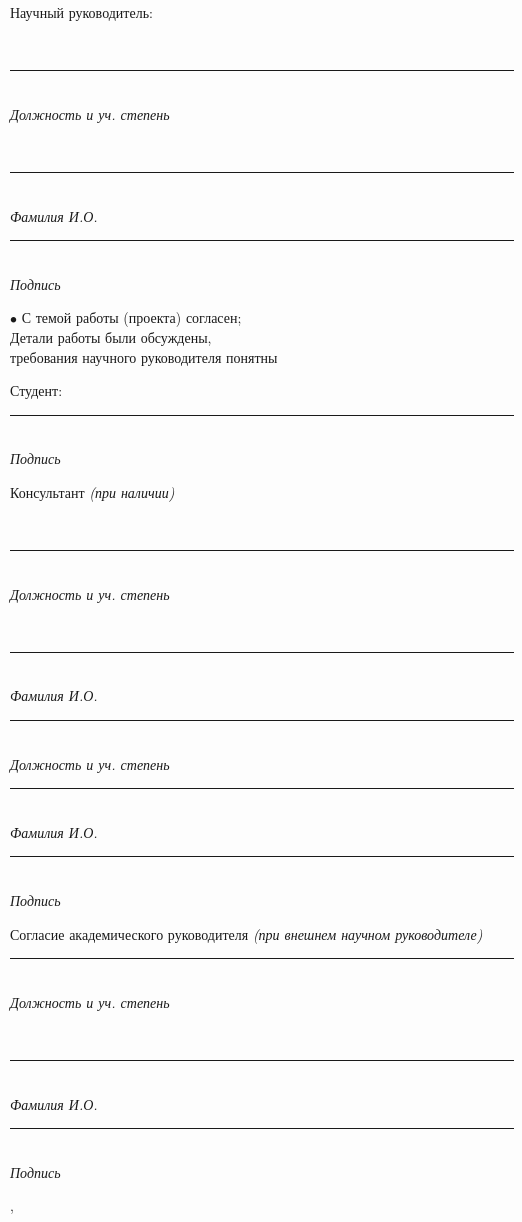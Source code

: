 \documentclass[12pt,a4paper]{article}
\newcommand{\hseSignField}[2]{%
  \begin{minipage}[t]{#1}\centering
    \rule{\linewidth}{0.4pt}\\[-2pt]{\footnotesize\itshape #2}
  \end{minipage}}
\newcommand{\hseFilledField}[3]{%
  \begin{minipage}[t]{#1}\centering
    {\small\strut #2}\\[-4pt]\rule{\linewidth}{0.4pt}\\[-2pt]{\footnotesize\itshape #3}
  \end{minipage}}
\begin{document}
\vspace{0.3cm}
\begin{minipage}[t]{0.27\textwidth}\raggedright Научный руководитель:\end{minipage}%
\hseFilledField{0.3\textwidth}{\hseSupervisorTitle\ifdefempty{\hseSupervisorDegree}{}{, \hseSupervisorDegree}}{Должность и уч. степень}\hfill
\hseFilledField{0.22\textwidth}{\hseSupervisorShortName}{Фамилия И.О.}\hfill
\hseSignField{0.15\textwidth}{Подпись}

\vspace{0.5cm}
\begin{minipage}[t]{0.55\textwidth}
$\bullet$ С темой работы (проекта) согласен;\\
Детали работы были обсуждены,\\
требования научного руководителя понятны
\end{minipage}\hfill
\begin{minipage}[t]{0.4\textwidth}
\vspace{0.5cm}
Студент: \hfill \hseSignField{0.5\textwidth}{Подпись}
\end{minipage}

\vspace{0.5cm}
\begin{minipage}[t]{0.27\textwidth}\raggedright Консультант {\itshape(при наличии)}\end{minipage}%
\ifhseHasCoSupervisor
\hseFilledField{0.3\textwidth}{\hseCoSupervisorTitle\ifdefempty{\hseCoSupervisorDegree}{}{, \hseCoSupervisorDegree}}{Должность и уч. степень}\hfill
\hseFilledField{0.22\textwidth}{\hseCoSupervisorShortName}{Фамилия И.О.}\hfill
\else
\hseSignField{0.3\textwidth}{Должность и уч. степень}\hfill
\hseSignField{0.22\textwidth}{Фамилия И.О.}\hfill
\fi
\hseSignField{0.15\textwidth}{Подпись}

\vspace{0.5cm}
\begin{minipage}[t]{0.27\textwidth}\raggedright Согласие академического руководителя {\itshape(при внешнем научном руководителе)}\end{minipage}%
\hseSignField{0.3\textwidth}{Должность и уч. степень}\hfill
\hseFilledField{0.22\textwidth}{\hseAcademicSupervisorShortName}{Фамилия И.О.}\hfill
\hseSignField{0.15\textwidth}{Подпись}

\vfill
\begin{center}\hseCity, \the\year\end{center}
\end{document}
